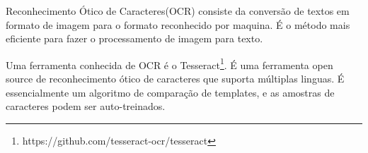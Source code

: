 Reconhecimento Ótico de Caracteres(OCR) consiste da conversão de textos em
formato de imagem para o formato reconhecido por maquina. É o método mais
eficiente para fazer o processamento de imagem para
texto.~\cite{mohit2015designing}

Uma ferramenta conhecida de OCR é o
Tesseract\footnote{https://github.com/tesseract-ocr/tesseract}. É uma ferramenta
open source de reconhecimento ótico de caracteres que suporta múltiplas linguas.
É essencialmente um algoritmo de comparação de templates, e as amostras de
caracteres podem ser auto-treinados.~\cite{ho2016intelligent}

